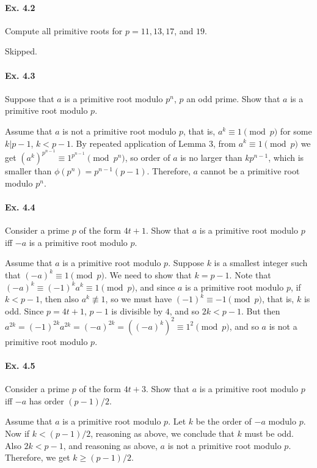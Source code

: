 \documentclass[notitlepage]{article}
\theoremstyle{definition}
\begin{document}
\paragraph{Ex. 4.2}
Compute all primitive roots for $p = 11, 13, 17$, and $19$.

Skipped.

\paragraph{Ex. 4.3}
Suppose that $a$ is a primitive root modulo $p^n$, $p$ an odd
prime. Show that $a$ is a primitive root modulo $p$.

Assume that $a$ is not a primitive root modulo $p$, that is, $a^k
\equiv 1 \pmod p$ for some $k | p-1$, $k < p-1$. By repeated
application of Lemma 3, from $a^k \equiv 1 \pmod p$ we get
$(a^k)^{p^{n-1}} \equiv 1^{p^{n-1}} \pmod {p^n}$, so order of $a$ is
no larger than $k p^{n-1}$, which is smaller than $\phi(p^n) =
p^{n-1}(p-1)$. Therefore, $a$ cannot be a primitive root modulo $p^n$.

\paragraph{Ex. 4.4}
Consider a prime $p$ of the form $4t + 1$. Show that $a$ is a
primitive root modulo $p$ iff $-a$ is a primitive root modulo $p$.

Assume that $a$ is a primitive root modulo $p$. Suppose $k$ is a
smallest integer such that $(-a)^k \equiv 1 \pmod p$. We need to show
that $k = p - 1$. Note that $(-a)^k \equiv (-1)^k a^k \equiv 1 \pmod
p$, and since $a$ is a primitive root modulo $p$, if $k < p-1$, then
also $a^k \not \equiv 1$, so we must have $(-1)^k \equiv -1 \pmod p$,
that is, $k$ is odd. Since $p = 4t + 1$, $p-1$ is divisible by $4$,
and so $2k < p-1$. But then $a^{2k} = (-1)^{2k}a^{2k} = (-a)^{2k} =
((-a)^k)^2 \equiv 1^2 \pmod p$, and so $a$ is not a primitive root
modulo $p$.

\paragraph{Ex. 4.5}
Consider a prime $p$ of the form $4t + 3$. Show that $a$ is a
primitive root modulo $p$ iff $-a$ has order $(p - 1)/2$.

Assume that $a$ is a primitive root modulo $p$. Let $k$ be the order
of $-a$ modulo $p$. Now if $k < (p-1)/2$, reasoning as above, we
conclude that $k$ must be odd. Also $2k < p-1$, and reasoning as
above, $a$ is not a primitive root modulo $p$. Therefore, we get $k
\geq (p-1)/2$.
\end{document}
